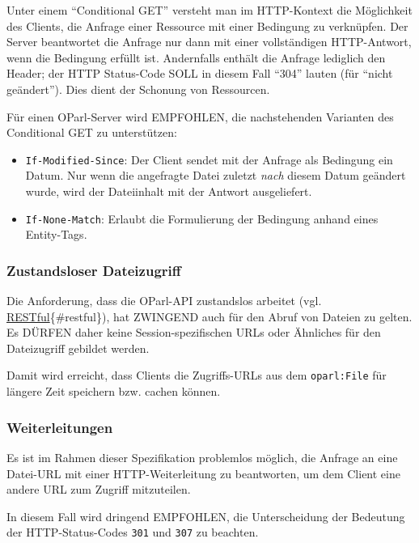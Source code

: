 \documentclass[,a4paper]{article}
\begin{document}
Unter einem ``Conditional GET'' versteht man im HTTP-Kontext die
Möglichkeit des Clients, die Anfrage einer Ressource mit einer Bedingung
zu verknüpfen. Der Server beantwortet die Anfrage nur dann mit einer
vollständigen HTTP-Antwort, wenn die Bedingung erfüllt ist. Andernfalls
enthält die Anfrage lediglich den Header; der HTTP Status-Code SOLL in
diesem Fall ``304'' lauten (für ``nicht geändert''). Dies dient der
Schonung von Ressourcen.

Für einen OParl-Server wird EMPFOHLEN, die nachstehenden Varianten des
Conditional GET zu unterstützen:

\begin{itemize}
\item
  \texttt{If-Modified-Since}: Der Client sendet mit der Anfrage als
  Bedingung ein Datum. Nur wenn die angefragte Datei zuletzt \emph{nach}
  diesem Datum geändert wurde, wird der Dateiinhalt mit der Antwort
  ausgeliefert.
\item
  \texttt{If-None-Match}: Erlaubt die Formulierung der Bedingung anhand
  eines Entity-Tags.
\end{itemize}

\subsubsection{Zustandsloser
Dateizugriff}\label{zustandsloser-dateizugriff}

Die Anforderung, dass die OParl-API zustandslos arbeitet (vgl.
\hyperref[restful]{RESTful}\{\#restful\}), hat ZWINGEND auch für den
Abruf von Dateien zu gelten. Es DÜRFEN daher keine Session-spezifischen
URLs oder Ähnliches für den Dateizugriff gebildet werden.

Damit wird erreicht, dass Clients die Zugriffs-URLs aus dem
\texttt{oparl:File} für längere Zeit speichern bzw. cachen können.

\subsubsection{Weiterleitungen}\label{weiterleitungen}

Es ist im Rahmen dieser Spezifikation problemlos möglich, die Anfrage an
eine Datei-URL mit einer HTTP-Weiterleitung zu beantworten, um dem
Client eine andere URL zum Zugriff mitzuteilen.

In diesem Fall wird dringend EMPFOHLEN, die Unterscheidung der Bedeutung
der HTTP-Status-Codes \texttt{301} und \texttt{307} zu beachten.
\end{document}
